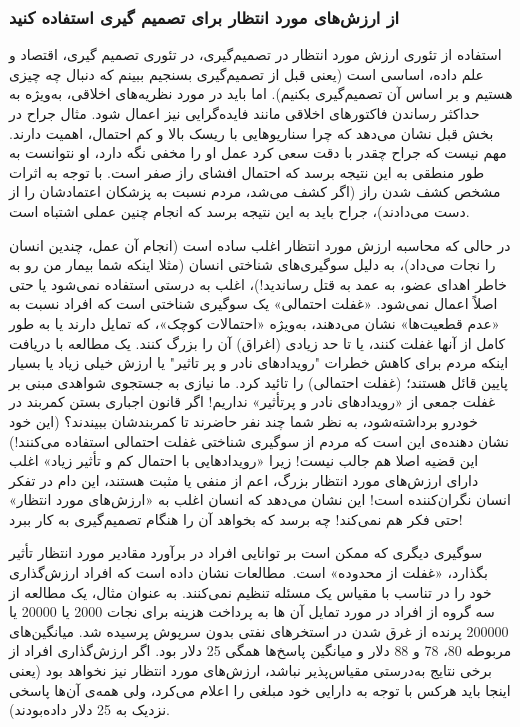 \subsubsection*{از ارزش‌های مورد انتظار برای تصمیم گیری استفاده کنید}
\label{subsubsec:از ارزش‌های مورد انتظار برای تصمیم گیری استفاده کنید}
استفاده از تئوری ارزش مورد انتظار در تصمیم‌گیری، در تئوری تصمیم گیری، اقتصاد و علم داده، اساسی است (یعنی قبل از تصمیم‌گیری بسنجیم ببینم که دنبال چه چیزی هستیم و بر اساس آن تصمیم‌گیری بکنیم).
اما باید در مورد نظریه‌های اخلاقی، به‌ویژه به حداکثر رساندن فاکتورهای اخلاقی مانند فایده‌گرایی نیز اعمال شود.
مثال جراح در بخش قبل نشان می‌دهد که چرا سناریوهایی با ریسک بالا و کم احتمال، اهمیت دارند.
مهم نیست که جراح چقدر با دقت سعی کرد عمل او را مخفی نگه دارد، او نتوانست به طور منطقی به این نتیجه برسد که احتمال افشای راز صفر است.
با توجه به اثرات مشخص کشف شدن راز (اگر کشف می‌شد، مردم نسبت به پزشکان اعتمادشان را از دست می‌دادند)، جراح باید به این نتیجه برسد که انجام چنین عملی اشتباه است.

در حالی که محاسبه ارزش مورد انتظار اغلب ساده است (انجام آن عمل، چندین انسان را نجات می‌داد)، به دلیل سوگیری‌های شناختی انسان (مثلا اینکه شما بیمار من رو به خاطر اهدای عضو، به عمد به قتل رساندید!)، اغلب به درستی استفاده نمی‌شود یا حتی اصلاً اعمال نمی‌شود.
«غفلت احتمالی» یک سوگیری شناختی است که افراد نسبت به «عدم قطعیت‌ها» نشان می‌دهند، به‌ویژه «احتمالات کوچک»، که تمایل دارند یا به طور کامل از آنها غفلت کنند، یا تا حد زیادی (اغراق) آن را بزرگ کنند.
یک مطالعه با دریافت اینکه مردم برای کاهش خطرات "رویدادهای نادر و پر تاثیر" یا ارزش خیلی زیاد یا بسیار پایین قائل هستند؛ (غفلت احتمالی) را تائید کرد.
ما نیازی به جستجوی شواهدی مبنی بر غفلت جمعی از «رویدادهای نادر و پرتأثیر» نداریم!
اگر قانون اجباری بستن کمربند در خودرو برداشته‌شود، به نظر شما چند نفر حاضرند تا کمربندشان ببیندند؟ (این خود نشان دهنده‌ی این است که مردم از سوگیری شناختی غفلت احتمالی استفاده می‌کنند!) این قضیه اصلا هم جالب نیست!
زیرا «رویدادهایی با احتمال کم و تأثیر زیاد» اغلب دارای ارزش‌های مورد انتظار بزرگ، اعم از منفی یا مثبت هستند، این دام در تفکر انسان نگران‌کننده است!
این نشان می‌دهد که انسان اغلب به «ارزش‌های مورد انتظار» حتی فکر هم نمی‌کند!
چه برسد که بخواهد آن را هنگام تصمیم‌گیری به کار ببرد!

سوگیری دیگری که ممکن است بر توانایی افراد در برآورد مقادیر مورد انتظار تأثیر بگذارد، «غفلت از محدوده» است.\     مطالعات نشان داده است که افراد ارزش‌گذاری خود را در تناسب با مقیاس یک مسئله تنظیم نمی‌کنند.
به عنوان مثال، یک مطالعه از سه گروه از افراد در مورد تمایل آن ها به پرداخت هزینه برای نجات 2000 یا 20000 یا 200000 پرنده از غرق شدن در استخرهای نفتی بدون سرپوش پرسیده شد.
میانگین‌های مربوطه 80، 78 و 88 دلار و میانگین پاسخ‌ها همگی 25 دلار بود.
اگر ارزش‌گذاری افراد از برخی نتایج به‌درستی مقیاس‌پذیر نباشد، ارزش‌های مورد انتظار نیز نخواهد بود (یعنی اینجا باید هرکس با توجه به دارایی خود مبلغی را اعلام می‌کرد، ولی همه‌ی آن‌ها پاسخی نزدیک به 25 دلار داده‌بودند).


